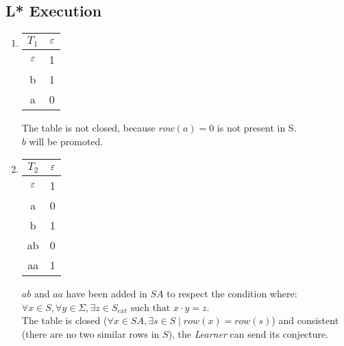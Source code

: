\subsection{L* Execution}
\begin{enumerate}
  \item \begin{minipage}{0.3\textwidth}
          \begin{tabular}{c||c}
            $T_1$ & $\varepsilon$ \\
            \hline\hline
            $\varepsilon$  & 1    \\
            \hline\hline
            b     & 1    \\
            a     & 0    \\
          \end{tabular}
        \end{minipage} \quad
        \begin{minipage}{0.6\textwidth}
          The table is not closed, because $row(a) = 0$ is not present in S. \\
          $b$ will be promoted.
        \end{minipage}
  \item \begin{minipage}{0.3\textwidth}
          \begin{tabular}{c||c}
            $T_2$ & $\varepsilon$ \\
            \hline\hline
            $\varepsilon$  & 1    \\
            a     & 0    \\
            \hline\hline
            b     & 1    \\
            ab    & 0    \\
            aa    & 1    \\
          \end{tabular}
        \end{minipage}\quad
        \begin{minipage}{0.6\textwidth}
          $ab$ and $aa$ have been added in $SA$ to respect the condition where: $\forall x \in S, \forall y \in \Sigma, \exists z \in S_{ext} \text{ such that } x \cdot y = z $.\\
          The table is closed ($\forall x \in SA, \exists s \in S \mid row(x) = row(s)$) and consistent (there are no two similar rows in $S$), the \textit{Learner} can send its conjecture.
        \end{minipage}


\end{enumerate}

